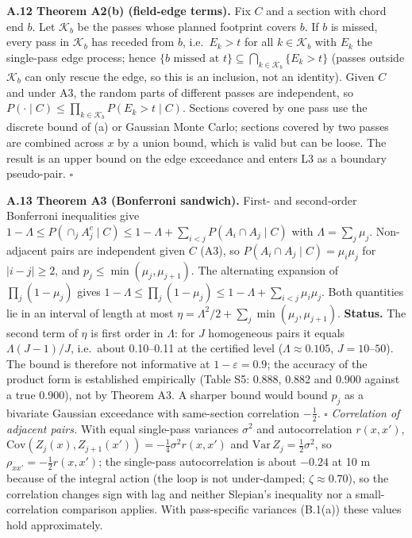 \documentclass[preprint,12pt,authoryear]{elsarticle}
\begin{document}
\textbf{A.12 Theorem A2(b) (field-edge terms).} Fix \(C\) and a section with chord end \(b\). Let \(\mathcal K_b\) be the passes whose planned footprint covers \(b\). If \(b\) is missed, every pass in \(\mathcal K_b\) has receded from \(b\), i.e.~\(E_k>t\) for all \(k\in\mathcal K_b\) with \(E_k\) the single-pass edge process; hence \(\{b\text{ missed at }t\}\subseteq\bigcap_{k\in\mathcal K_b}\{E_k>t\}\) (passes outside \(\mathcal K_b\) can only rescue the edge, so this is an inclusion, not an identity). Given \(C\) and under A3, the random parts of different passes are independent, so \(P(\cdot\mid C)\le\prod_{k\in\mathcal K_b}P(E_k>t\mid C)\). Sections covered by one pass use the discrete bound of (a) or Gaussian Monte Carlo; sections covered by two passes are combined across \(x\) by a union bound, which is valid but can be loose. The result is an upper bound on the edge exceedance and enters L3 as a boundary pseudo-pair. \(\square\)

\textbf{A.13 Theorem A3 (Bonferroni sandwich).} First- and second-order Bonferroni inequalities give \(1-\Lambda\le P(\cap_jA_j^c\mid C)\le1-\Lambda+\sum_{i<j}P(A_i\cap A_j\mid C)\) with \(\Lambda=\sum_j\mu_j\). Non-adjacent pairs are independent given \(C\) (A3), so \(P(A_i\cap A_j\mid C)=\mu_i\mu_j\) for \(|i-j|\ge2\), and \(p_j\le\min(\mu_j,\mu_{j+1})\). The alternating expansion of \(\prod_j(1-\mu_j)\) gives \(1-\Lambda\le\prod_j(1-\mu_j)\le1-\Lambda+\sum_{i<j}\mu_i\mu_j\). Both quantities lie in an interval of length at most \(\eta=\Lambda^2/2+\sum_j\min(\mu_j,\mu_{j+1})\). \textbf{Status.} The second term of \(\eta\) is first order in \(\Lambda\): for \(J\) homogeneous pairs it equals \(\Lambda(J-1)/J\), i.e.~about 0.10--0.11 at the certified level (\(\Lambda\approx0.105\), \(J=10\)--\(50\)). The bound is therefore not informative at \(1-\varepsilon=0.9\); the accuracy of the product form is established empirically (Table S5: 0.888, 0.882 and 0.900 against a true 0.900), not by Theorem A3. A sharper bound would bound \(p_j\) as a bivariate Gaussian exceedance with same-section correlation \(-\tfrac12\). \(\square\)
\emph{Correlation of adjacent pairs.} With equal single-pass variances \(\sigma^2\) and autocorrelation \(r(x,x')\), \(\mathrm{Cov}(Z_j(x),Z_{j+1}(x'))=-\tfrac14\sigma^2r(x,x')\) and \(\mathrm{Var}\,Z_j=\tfrac12\sigma^2\), so \(\rho_{xx'}=-\tfrac12r(x,x')\); the single-pass autocorrelation is about \(-0.24\) at 10 m because of the integral action (the loop is not under-damped; \(\zeta\approx0.70\)), so the correlation changes sign with lag and neither Slepian's inequality nor a small-correlation comparison applies. With pass-specific variances (B.1(a)) these values hold approximately.
\end{document}
